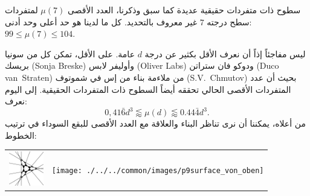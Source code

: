 \begin{surferPage}[216 Singularities]{سطوح ذات متفردات حقيقية عديدة} 
كما سبق وذكرنا، العدد الأقصى $\mu(7)$ لمتفردات سطح درجته $7$ غير معروف بالتحديد. كل ما لدينا هو حد أعلى وحد أدنى: $99\le \mu(7) \le 104$. 

   ليس مفاجئاً إذاً أن نعرف الأقل بكثير عن درجة  $d$ عامة.
    على الأقل، تمكن كل من سونيا بريسك 
    \textenglish{(Sonja Breske)}
     وأوليفر لابس
      \textenglish{(Oliver Labs)}
       ودوكو فان ستراتن
        \textenglish{(Duco van~Straten)}
         من ملاءمة بناء من إس في شموتوف 
         \textenglish{(S.V.\ Chmutov)}
         بحيث أن عدد المتفردات الأقصى الحالي تحققه أيضاً السطوح ذات المتفردات الحقيقية.
    إلى اليوم نعرف:
    \[0,41\bar{6}d^3 \lessapprox \mu(d) \lessapprox 0.44\bar{4} d^3.\]
    من أعلاه، يمكننا أن نرى تناظر البناء والعلاقة مع العدد الأقصى للبقع السوداء في ترتيب الخطوط:
    \begin{center}
      \begin{tabular}{c@{\qquad}c}
        \includegraphics[height=1.5cm]{./../../common/images/vielesing.pdf}
        &
        \texttt{[image: ./../../common/images/p9surface\_von\_oben]}
      \end{tabular}
    \end{center}
\end{surferPage}
